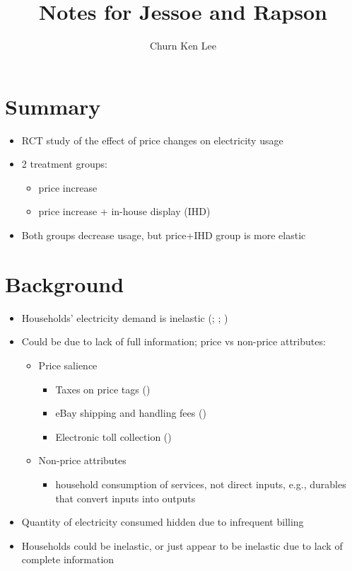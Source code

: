 \documentclass[12pt]{article}
\title{Notes for Jessoe and Rapson}
\author{Churn Ken Lee}
\date{}
\begin{document}
\maketitle

\section{Summary}
\begin{itemize}
    \item RCT study of the effect of price changes on electricity usage
    \item 2 treatment groups:
        \begin{itemize}
            \item price increase
            \item price increase + in-house display (IHD)
        \end{itemize}
    \item Both groups decrease usage, but price+IHD group is more elastic
\end{itemize}

\section{Background}
\begin{itemize}
    \item Households' electricity demand is inelastic (\cite{reiss_white_2005}; \cite{alcott_2011}; \cite{ito_2014})
    \item Could be due to lack of full information; price vs non-price attributes:
        \begin{itemize}
            \item Price salience
                \begin{itemize}
                    \item Taxes on price tags (\cite{chetty_looney_kroft_2009})
                    \item eBay shipping and handling fees (\cite{hossain_morgan_2006})
                    \item Electronic toll collection (\cite{finkelstein_2009})
                \end{itemize}
            \item Non-price attributes 
                \begin{itemize}
                    \item household consumption of services, not direct inputs, e.g., durables that convert inputs into outputs
                \end{itemize}
        \end{itemize}
    \item Quantity of electricity consumed hidden due to infrequent billing
    \item Households could be inelastic, or just appear to be inelastic due to lack of complete information
\end{itemize}
\end{document}
